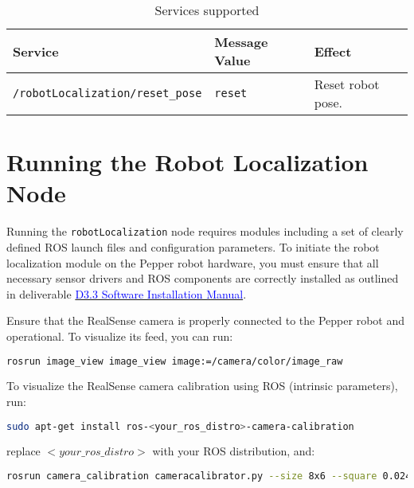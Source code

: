 \documentclass{CSSRforAfrica}
\begin{document}
\begin{table}[H]
\centering
\caption{Services supported}
\label{tab:services supported}
\begin{tabularx}{\textwidth}{|l|l|X|}
\hline
\textbf{Service} & \textbf{Message Value} & \textbf{Effect} \\ \hline
\verb|/robotLocalization/reset_pose| & \texttt{reset} & Reset robot pose. \\ \hline
\end{tabularx}
\end{table}


\newpage


\section{Running the Robot Localization Node}

Running the \texttt{robotLocalization} node requires modules including a set of clearly defined ROS launch files and configuration parameters. To initiate the robot localization module on the Pepper robot hardware, you must ensure that all necessary sensor drivers and ROS components are correctly installed as outlined in deliverable \href{https://cssr4africa.github.io/deliverables/CSSR4Africa_Deliverable_D3.3.pdf}{\textcolor{blue}{D3.3 Software Installation Manual}}.

\begin{tcolorbox}[colback=yellow!10, colframe=black, title= \textbf{NOTE}]
Ensure that the RealSense camera is properly connected to the Pepper robot and operational. To visualize its feed, you can run:  

\begin{lstlisting}[style=withoutNumbering, language=bash]
rosrun image_view image_view image:=/camera/color/image_raw
\end{lstlisting}

To visualize the RealSense camera calibration using ROS (intrinsic parameters), run:

\begin{lstlisting}[style=withoutNumbering, language=bash]
sudo apt-get install ros-<your_ros_distro>-camera-calibration
\end{lstlisting}
replace $<your\_ros\_distro>$ with your ROS distribution, and:
\begin{lstlisting}[style=withoutNumbering, language=bash]
rosrun camera_calibration cameracalibrator.py --size 8x6 --square 0.024 image:=/camera/color/image_raw camera:=/camera/color
\end{lstlisting}
\end{tcolorbox}
\end{document}
